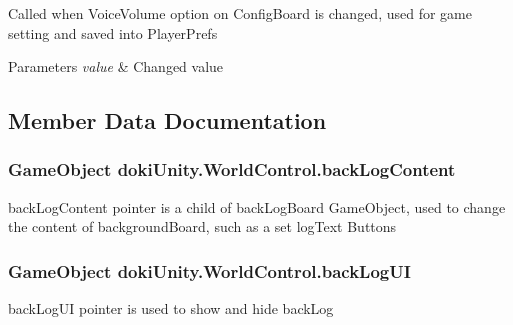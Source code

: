 Called when Voice\+Volume option on Config\+Board is changed, used for game setting and saved into Player\+Prefs 


\begin{DoxyParams}{Parameters}
{\em value} & Changed value\\
\hline
\end{DoxyParams}


\subsection{Member Data Documentation}
\subsubsection[{\texorpdfstring{back\+Log\+Content}{backLogContent}}]{\setlength{\rightskip}{0pt plus 5cm}Game\+Object doki\+Unity.\+World\+Control.\+back\+Log\+Content}\hypertarget{classdoki_unity_1_1_world_control_a833394abd1744d3fa592070b6c99b9d4}{}\label{classdoki_unity_1_1_world_control_a833394abd1744d3fa592070b6c99b9d4}


back\+Log\+Content pointer is a child of back\+Log\+Board Game\+Object, used to change the content of background\+Board, such as a set log\+Text Buttons 

\subsubsection[{\texorpdfstring{back\+Log\+UI}{backLogUI}}]{\setlength{\rightskip}{0pt plus 5cm}Game\+Object doki\+Unity.\+World\+Control.\+back\+Log\+UI}\hypertarget{classdoki_unity_1_1_world_control_a0a45da5cc8aca07edcb84b2b4efdb405}{}\label{classdoki_unity_1_1_world_control_a0a45da5cc8aca07edcb84b2b4efdb405}


back\+Log\+UI pointer is used to show and hide back\+Log 

